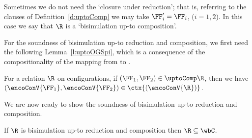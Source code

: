\DSOCTb

\noindent
Sometimes we do not need  the `closure under reduction'; that is,  referring to  the clauses
of Definition~\ref{d:uptoComp} 
 we may take  
$\FF'_i = \FF_i$, ($i=1,2$).
In this case  
we say that $\R$ is a 
`{bisimulation up-to
   composition}'.

For the soundness of 
bisimulation up-to reduction and composition,
we first need the following Lemma~\ref{l:uptoOGSpi}, 
which is a  consequence of the compositionality of the mapping from
\COGS to \piI.  

\begin{lemma}
\label{l:uptoOGSpi}
For a relation $\R$ on \COGS configurations, 
if 
${(\FF_1, \FF_2)} \in  { \uptoComp \R}$, then 
we have $( \encoConV {\FF_1},  \encoConV {\FF_2}) \in  \ctx{( \encoConV{ \R })}$. 
\end{lemma} 

\noindent
We are now ready to show  the soundness of 
bisimulation up-to reduction and composition.

\begin{theorem}
\label{t:uptoComp}
If $\R$ is bisimulation up-to
reduction and composition then ${\R} \subseteq {\wbC}$.
\end{theorem} 


